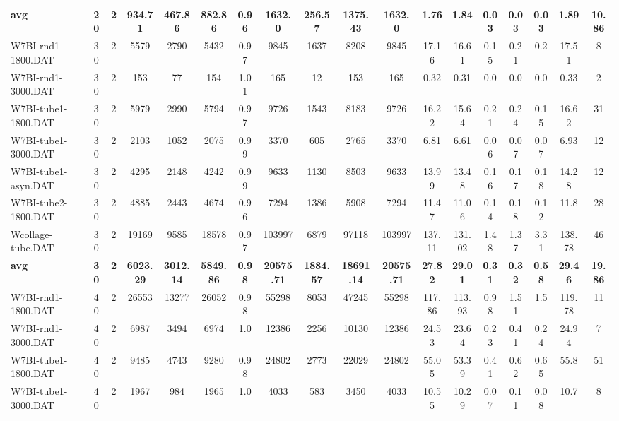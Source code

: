 \begin{sidewaystable}[h]
{\begin{tabular}{lccccccccccccccccc}
\cline{1-18} \textbf{avg} & \textbf{20} & \textbf{2} & \textbf{934.71} & \textbf{467.86} & \textbf{882.86} & \textbf{0.96} & \textbf{1632.0} & \textbf{256.57} & \textbf{1375.43} & \textbf{1632.0} & \textbf{1.76} & \textbf{1.84} & \textbf{0.03} & \textbf{0.03} & \textbf{0.03} & \textbf{1.89} & \textbf{10.86} \\ \cline{1-18}
W7BI-rnd1-1800.DAT & 30 & 2 & 5579 & 2790 & 5432 & 0.97 & 9845 & 1637 & 8208 & 9845 & 17.16 & 16.61 & 0.15 & 0.21 & 0.2 & 17.51 & 8\\
W7BI-rnd1-3000.DAT & 30 & 2 & 153 & 77 & 154 & 1.01 & 165 & 12 & 153 & 165 & 0.32 & 0.31 & 0.0 & 0.0 & 0.0 & 0.33 & 2\\
W7BI-tube1-1800.DAT & 30 & 2 & 5979 & 2990 & 5794 & 0.97 & 9726 & 1543 & 8183 & 9726 & 16.22 & 15.64 & 0.21 & 0.24 & 0.15 & 16.62 & 31\\
W7BI-tube1-3000.DAT & 30 & 2 & 2103 & 1052 & 2075 & 0.99 & 3370 & 605 & 2765 & 3370 & 6.81 & 6.61 & 0.06 & 0.07 & 0.07 & 6.93 & 12\\
W7BI-tube1-asyn.DAT & 30 & 2 & 4295 & 2148 & 4242 & 0.99 & 9633 & 1130 & 8503 & 9633 & 13.99 & 13.48 & 0.16 & 0.17 & 0.18 & 14.28 & 12\\
W7BI-tube2-1800.DAT & 30 & 2 & 4885 & 2443 & 4674 & 0.96 & 7294 & 1386 & 5908 & 7294 & 11.47 & 11.06 & 0.14 & 0.18 & 0.12 & 11.8 & 28\\
Wcollage-tube.DAT & 30 & 2 & 19169 & 9585 & 18578 & 0.97 & 103997 & 6879 & 97118 & 103997 & 137.11 & 131.02 & 1.48 & 1.37 & 3.31 & 138.78 & 46\\
\cline{1-18} \textbf{avg} & \textbf{30} & \textbf{2} & \textbf{6023.29} & \textbf{3012.14} & \textbf{5849.86} & \textbf{0.98} & \textbf{20575.71} & \textbf{1884.57} & \textbf{18691.14} & \textbf{20575.71} & \textbf{27.82} & \textbf{29.01} & \textbf{0.31} & \textbf{0.32} & \textbf{0.58} & \textbf{29.46} & \textbf{19.86} \\ \cline{1-18}
W7BI-rnd1-1800.DAT & 40 & 2 & 26553 & 13277 & 26052 & 0.98 & 55298 & 8053 & 47245 & 55298 & 117.86 & 113.93 & 0.98 & 1.51 & 1.5 & 119.78 & 11\\
W7BI-rnd1-3000.DAT & 40 & 2 & 6987 & 3494 & 6974 & 1.0 & 12386 & 2256 & 10130 & 12386 & 24.53 & 23.64 & 0.23 & 0.41 & 0.24 & 24.94 & 7\\
W7BI-tube1-1800.DAT & 40 & 2 & 9485 & 4743 & 9280 & 0.98 & 24802 & 2773 & 22029 & 24802 & 55.05 & 53.39 & 0.41 & 0.62 & 0.65 & 55.8 & 51\\
W7BI-tube1-3000.DAT & 40 & 2 & 1967 & 984 & 1965 & 1.0 & 4033 & 583 & 3450 & 4033 & 10.55 & 10.29 & 0.07 & 0.11 & 0.08 & 10.7 & 8\\

\end{tabular}}
\end{sidewaystable}
